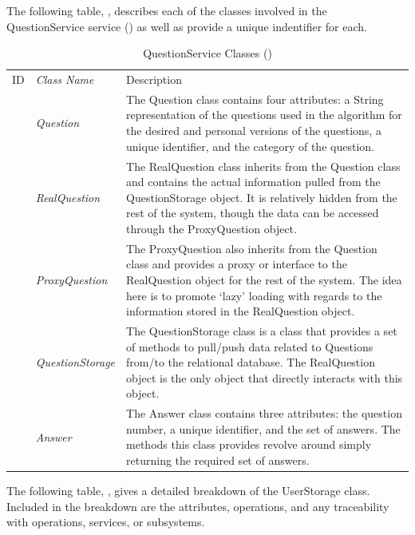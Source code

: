 \documentclass[12pt,letterpaper]{article}
\begin{document}
The following table, , describes each of the classes involved in the QuestionService service () as well as provide a unique indentifier for each.

\begin{table}[H]
	\caption{QuestionService Classes ()} 
	\begin{tabu} to 
	    \tableheader{}ID & Class Name & Description \\
		 & Question & The Question class contains four attributes: a String representation of the questions used in the algorithm for the desired and personal versions of the questions, a unique identifier, and the category of the question. \\
		 & RealQuestion & The RealQuestion class inherits from the Question class and contains the actual information pulled from the QuestionStorage object. It is relatively hidden from the rest of the system, though the data can be accessed through the ProxyQuestion object.\\
		 & ProxyQuestion & The ProxyQuestion also inherits from the Question class and provides a proxy or interface to the RealQuestion object for the rest of the system. The idea here is to promote `lazy' loading with regards to the information stored in the RealQuestion object.\\
		 & QuestionStorage & The QuestionStorage class is a class that provides a set of methods to pull/push data related to Questions from/to the relational database. The RealQuestion object is the only object that directly interacts with this object.\\
		 & Answer & The Answer class contains three attributes: the question number, a unique identifier, and the set of answers. The methods this class provides revolve around simply returning the required set of answers.\\
	\end{tabu}
\end{table}

The following table, , gives a detailed breakdown of the UserStorage class. Included in the breakdown are the attributes, operations, and any traceability with operations, services, or subsystems.
\end{document}
